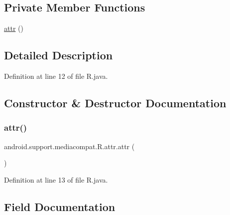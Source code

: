 \subsection*{Private Member Functions}
\begin{DoxyCompactItemize}
\item 
\mbox{\hyperlink{classandroid_1_1support_1_1mediacompat_1_1_r_1_1attr_a39bd6af2f0de210690655a6175c86818}{attr}} ()
\end{DoxyCompactItemize}


\subsection{Detailed Description}


Definition at line 12 of file R.\+java.



\subsection{Constructor \& Destructor Documentation}
\mbox{\label{classandroid_1_1support_1_1mediacompat_1_1_r_1_1attr_a39bd6af2f0de210690655a6175c86818}} 
\subsubsection{\texorpdfstring{attr()}{attr()}}
{\footnotesize\ttfamily android.\+support.\+mediacompat.\+R.\+attr.\+attr (\begin{DoxyParamCaption}{ }\end{DoxyParamCaption})\hspace{0.3cm}{\ttfamily [private]}}



Definition at line 13 of file R.\+java.


\begin{DoxyCode}{0}

\end{DoxyCode}


\subsection{Field Documentation}
\mbox{\label{classandroid_1_1support_1_1mediacompat_1_1_r_1_1attr_ade19dd71a2fbc3dcb0f6095fec0e920c}} 
